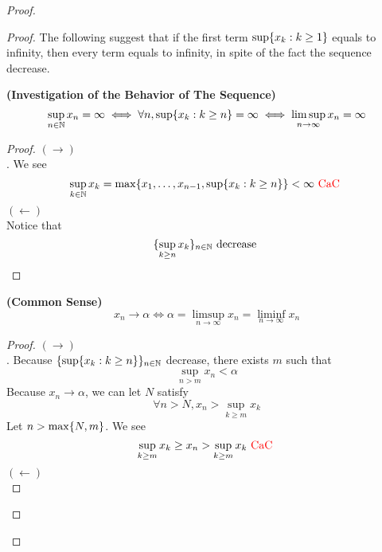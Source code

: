 \documentclass{report}
\begin{document}
\begin{proof}
\begin{proof}
{\begin{minipage}{39em}
The following suggest that if the first term  $\sup \{ x_k:k\geq 1 \}$ equals to infinity, then every term equals to infinity, in spite of the fact the sequence decrease. 
\end{minipage}}
\begin{theorem}
\label{4.4.2}
\textbf{(Investigation of the Behavior of The Sequence)} 
\begin{equation*}
\sup_{n\in\mathbb{N}} x_n=\infty \iff \forall n, \sup \{ x_k:k\geq n \}=\infty \iff  \limsup_{n\to\infty} x_n=\infty
\end{equation*}
\end{theorem}
\begin{proof}
$(\longrightarrow)$\\

. We see 
\begin{equation*}
\sup_{k\in\mathbb{N}} x_k= \max \{ x_1,\dots , x_{n-1}, \sup \{ x_k:k\geq n \} \}<\infty\text{ \textcolor{red}{CaC} }
\end{equation*}
$(\longleftarrow)$\\

Notice that 
\begin{equation*}
\{ \sup_{k\geq n}x_k \}_{n\in\mathbb{N}}\text{ decrease }
\end{equation*}
\end{proof}
\begin{theorem}
\label{4.4.3}
\textbf{(Common Sense)} 
\begin{equation*}
x_n \to \alpha \iff  \alpha =\limsup_{n\to\infty} x_n=\liminf_{n\to\infty} x_n
\end{equation*}
\end{theorem}
\begin{proof}
$(\longrightarrow)$\\

. Because $\{ \sup \{ x_k:k\geq n \} \}_{n\in\mathbb{N}}$ decrease, there exists $m$ such that 
\begin{equation*}
\sup_{n>m} x_n<\alpha 
\end{equation*}
Because $x_n \to \alpha $, we can let $N$ satisfy 
\begin{equation*}
\forall n>N, x_n>\sup_{k\geq m} x_k 
\end{equation*}
Let $n>\max \{ N,m \}$. We see 
\begin{equation*}
\sup_{k\geq m} x_k\geq x_n>\sup_{k\geq m} x_k\text{ \textcolor{red}{CaC} }
\end{equation*}
$(\longleftarrow)$\\


\end{proof}
\end{proof}
\end{proof}
\end{document}
